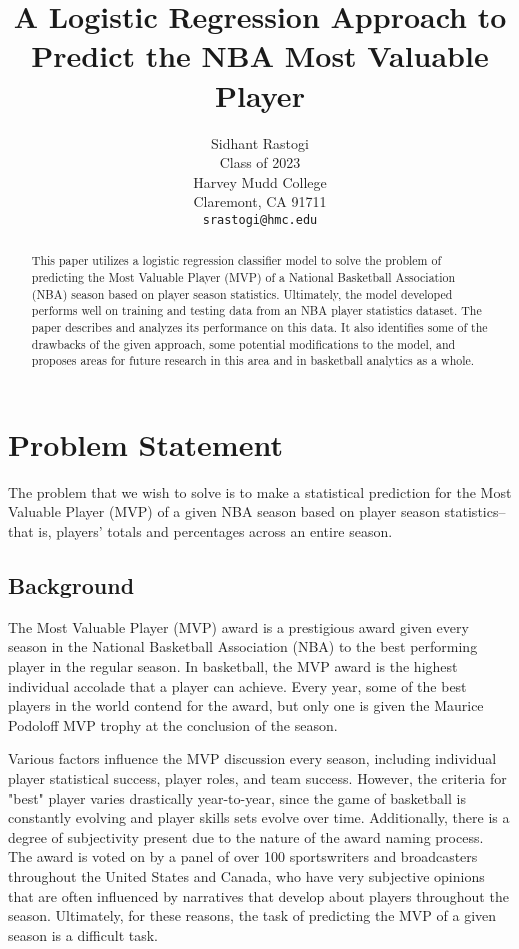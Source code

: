 \documentclass{article}
\title{A Logistic Regression Approach to Predict the NBA Most Valuable Player}
\author{%
  \large Sidhant Rastogi\\
  \large Class of 2023\\
  \large Harvey Mudd College\\
  \large Claremont, CA 91711 \\
  \large \texttt{srastogi@hmc.edu} \\
}
\begin{document}

\maketitle

\begin{abstract}
\large This paper utilizes a logistic regression classifier model to solve the problem of predicting the Most Valuable Player (MVP) of a National Basketball Association (NBA) season based on player season statistics. Ultimately, the model developed performs well on training and testing data from an NBA player statistics dataset. The paper describes and analyzes its performance on this data. It also identifies some of the drawbacks of the given approach, some potential modifications to the model, and proposes areas for future research in this area and in basketball analytics as a whole.
\end{abstract}

\section{Problem Statement}

\large The problem that we wish to solve is to make a statistical prediction for the Most Valuable Player (MVP) of a given NBA season based on player season statistics–that is, players' totals and percentages across an entire season.

\subsection{Background}

The Most Valuable Player (MVP) award is a prestigious award given every season in the National Basketball Association (NBA) to the best performing player in the regular season. In basketball, the MVP award is the highest individual accolade that a player can achieve. Every year, some of the best players in the world contend for the award, but only one is given the Maurice Podoloff MVP trophy at the conclusion of the season.

Various factors influence the MVP discussion every season, including individual player statistical success, player roles, and team success. However, the criteria for "best" player varies drastically year-to-year, since the game of basketball is constantly evolving and player skills sets evolve over time. Additionally, there is a degree of subjectivity present due to the nature of the award naming process. The award is voted on by a panel of over 100 sportswriters and broadcasters throughout the United States and Canada, who have very subjective opinions that are often influenced by narratives that develop about players throughout the season. Ultimately, for these reasons, the task of predicting the MVP of a given season is a difficult task.
\end{document}

